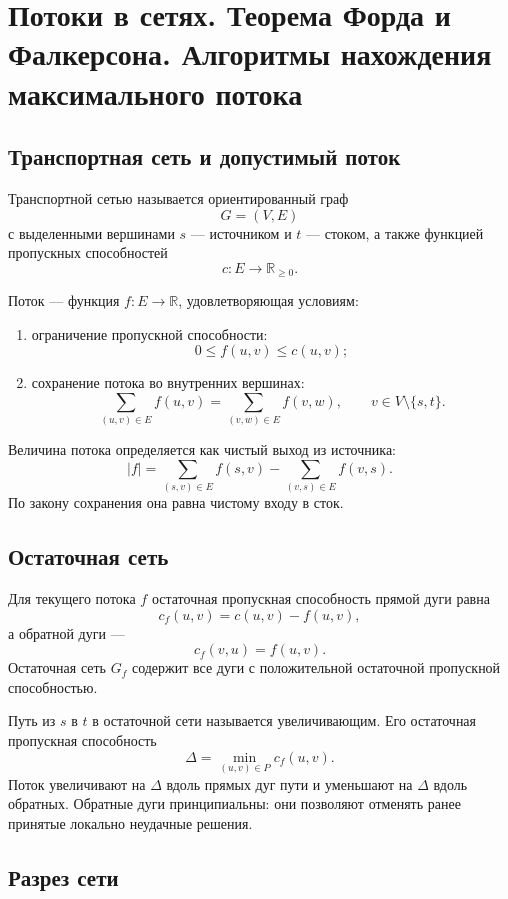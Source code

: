 \section{Потоки в сетях. Теорема Форда и Фалкерсона. Алгоритмы нахождения максимального потока}
\label{sec:network-flows}

\subsection{Транспортная сеть и допустимый поток}

Транспортной сетью называется ориентированный граф
\[
    G=(V,E)
\]
с выделенными вершинами $s$ --- источником и $t$ --- стоком, а также функцией
пропускных способностей
\[
    c\colon E\to\mathbb R_{\geq0}.
\]

Поток --- функция $f\colon E\to\mathbb R$, удовлетворяющая условиям:
\begin{enumerate}
    \item ограничение пропускной способности:
    \[
        0\leq f(u,v)\leq c(u,v);
    \]
    \item сохранение потока во внутренних вершинах:
    \[
        \sum_{(u,v)\in E}f(u,v)
        =
        \sum_{(v,w)\in E}f(v,w),
        \qquad v\in V\setminus\{s,t\}.
    \]
\end{enumerate}

Величина потока определяется как чистый выход из источника:
\[
 |f|=
 \sum_{(s,v)\in E}f(s,v)
 -
 \sum_{(v,s)\in E}f(v,s).
\]
По закону сохранения она равна чистому входу в сток.

\subsection{Остаточная сеть}

Для текущего потока $f$ остаточная пропускная способность прямой дуги равна
\[
    c_f(u,v)=c(u,v)-f(u,v),
\]
а обратной дуги ---
\[
    c_f(v,u)=f(u,v).
\]
Остаточная сеть $G_f$ содержит все дуги с положительной остаточной пропускной
способностью.

Путь из $s$ в $t$ в остаточной сети называется увеличивающим. Его остаточная
пропускная способность
\[
    \Delta=\min_{(u,v)\in P}c_f(u,v).
\]
Поток увеличивают на $\Delta$ вдоль прямых дуг пути и уменьшают на $\Delta$
вдоль обратных. Обратные дуги принципиальны: они позволяют отменять ранее
принятые локально неудачные решения.

\subsection{Разрез сети}

